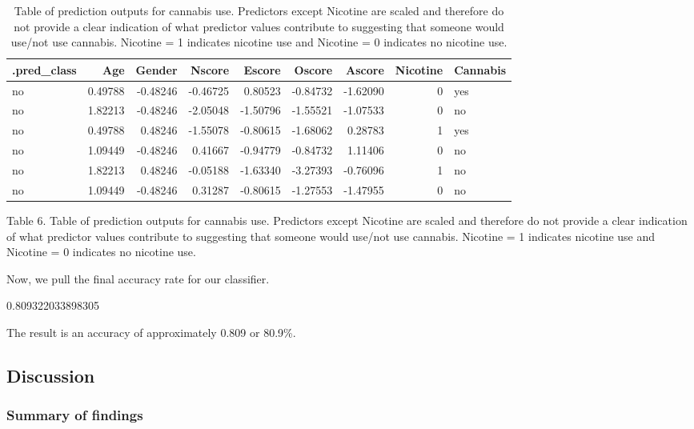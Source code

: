 \documentclass[
]{article}
\begin{document}
\begin{table}

\caption{\label{tab:drugs-pred-table}Table of prediction outputs for cannabis use. Predictors except Nicotine are scaled and therefore do not provide a clear indication of what predictor values contribute to suggesting that someone would use/not use cannabis. Nicotine = 1 indicates nicotine use and Nicotine = 0 indicates no nicotine use.}
\centering
\begin{tabular}[t]{l|r|r|r|r|r|r|r|l}
\hline
.pred\_class & Age & Gender & Nscore & Escore & Oscore & Ascore & Nicotine & Cannabis\\
\hline
no & 0.49788 & -0.48246 & -0.46725 & 0.80523 & -0.84732 & -1.62090 & 0 & yes\\
\hline
no & 1.82213 & -0.48246 & -2.05048 & -1.50796 & -1.55521 & -1.07533 & 0 & no\\
\hline
no & 0.49788 & 0.48246 & -1.55078 & -0.80615 & -1.68062 & 0.28783 & 1 & yes\\
\hline
no & 1.09449 & -0.48246 & 0.41667 & -0.94779 & -0.84732 & 1.11406 & 0 & no\\
\hline
no & 1.82213 & 0.48246 & -0.05188 & -1.63340 & -3.27393 & -0.76096 & 1 & no\\
\hline
no & 1.09449 & -0.48246 & 0.31287 & -0.80615 & -1.27553 & -1.47955 & 0 & no\\
\hline
\end{tabular}
\end{table}

Table 6. Table of prediction outputs for cannabis use. Predictors except Nicotine are scaled and therefore do not provide a clear indication of what predictor values contribute to suggesting that someone would use/not use cannabis. Nicotine = 1 indicates nicotine use and Nicotine = 0 indicates no nicotine use.

Now, we pull the final accuracy rate for our classifier.

0.809322033898305

The result is an accuracy of approximately 0.809 or 80.9\%.

\hypertarget{discussion}{%
\subsection{\texorpdfstring{\textbf{Discussion}}{Discussion}}\label{discussion}}

\hypertarget{summary-of-findings}{%
\subsubsection{Summary of findings}\label{summary-of-findings}}
\end{document}
